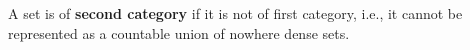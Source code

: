 A set is of \textbf{second category} if it is not of first category, i.e., it cannot be represented as a countable union of nowhere dense sets.
